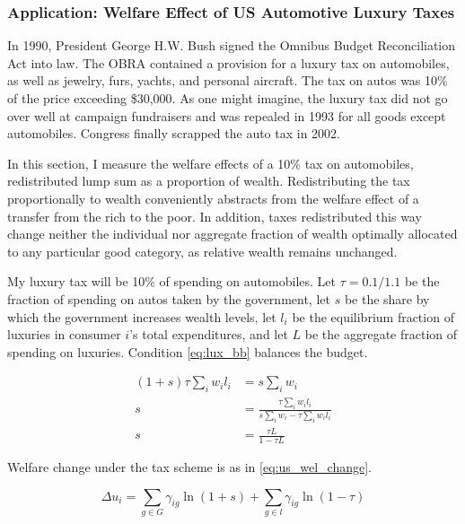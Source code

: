 \subsubsection{Application: Welfare Effect of US Automotive Luxury Taxes}

In 1990, President George H.W. Bush signed the Omnibus Budget Reconciliation Act into law.\footnotemark{}  The OBRA contained a provision for a luxury tax on automobiles, as well as jewelry, furs, yachts, and personal aircraft.  The tax on autos was 10\% of the price exceeding \$30,000.  As one might imagine, the luxury tax did not go over well at campaign fundraisers and was repealed in 1993 for all goods except automobiles.\footnotemark{}  Congress finally scrapped the auto tax in 2002.

In this section, I measure the welfare effects of a 10\% tax on automobiles, redistributed lump sum as a proportion of wealth.  Redistributing the tax proportionally to wealth conveniently abstracts from the welfare effect of a transfer from the rich to the poor.  In addition, taxes redistributed this way change neither the individual nor aggregate fraction of wealth optimally allocated to any particular good category, as relative wealth remains unchanged.

My luxury tax will be 10\% of spending on automobiles.  Let $\tau = 0.1 / 1.1$ be the fraction of spending on autos taken by the government, let $s$ be the share by which the government increases wealth levels, let $l_i$ be the equilibrium fraction of luxuries in consumer $i$'s total expenditures, and let $L$ be the aggregate fraction of spending on luxuries.  Condition \eqref{eq:lux_bb} balances the budget.

\begin{align}
    (1 + s) \tau \sum_i w_i l_i &= s \sum_i w_i \nonumber \\
    s &= \frac{\tau \sum_i w_i l_i}{s \sum_i w_i - \tau \sum_i w_i l_i} \nonumber \\
    \label{eq:lux_bb}
    s &= \frac{\tau L}{1 - \tau L}
\end{align}

Welfare change under the tax scheme is as in \eqref{eq:us_wel_change}.

\begin{equation}
    \label{eq:us_wel_change}
    \Delta u_i = \sum_{g\in G} \gamma_{ig} \ln(1 + s) + \sum_{g\in l} \gamma_{ig} \ln (1 - \tau)
\end{equation}

